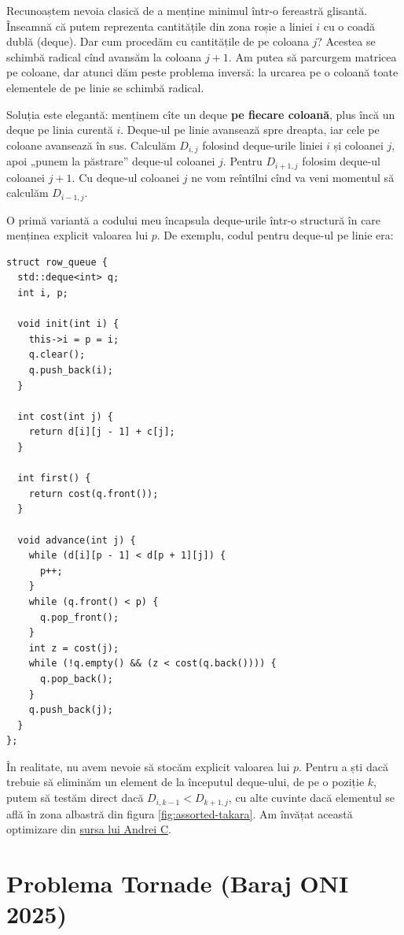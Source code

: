 Recunoaștem nevoia clasică de a menține minimul într-o fereastră glisantă. Înseamnă că putem reprezenta cantitățile din zona roșie a liniei $i$ cu o coadă dublă (deque). Dar cum procedăm cu cantitățile de pe coloana $j$? Acestea se schimbă radical cînd avansăm la coloana $j + 1$. Am putea să parcurgem matricea pe coloane, dar atunci dăm peste problema inversă: la urcarea pe o coloană toate elementele de pe linie se schimbă radical.

Soluția este elegantă: menținem cîte un deque \textbf{pe fiecare coloană}, plus încă un deque pe linia curentă $i$. Deque-ul pe linie avansează spre dreapta, iar cele pe coloane avansează în sus. Calculăm $D_{i,j}$ folosind deque-urile liniei $i$ și coloanei $j$, apoi „punem la păstrare” deque-ul coloanei $j$. Pentru $D_{i+1,j}$ folosim deque-ul coloanei $j+1$. Cu deque-ul coloanei $j$ ne vom reîntîlni cînd va veni momentul să calculăm $D_{i-1,j}$.

O primă variantă a codului meu încapsula deque-urile într-o structură în care menținea explicit valoarea lui $p$. De exemplu, codul pentru deque-ul pe linie era:

\begin{verbatim}
struct row_queue {
  std::deque<int> q;
  int i, p;

  void init(int i) {
    this->i = p = i;
    q.clear();
    q.push_back(i);
  }

  int cost(int j) {
    return d[i][j - 1] + c[j];
  }

  int first() {
    return cost(q.front());
  }

  void advance(int j) {
    while (d[i][p - 1] < d[p + 1][j]) {
      p++;
    }
    while (q.front() < p) {
      q.pop_front();
    }
    int z = cost(j);
    while (!q.empty() && (z < cost(q.back()))) {
      q.pop_back();
    }
    q.push_back(j);
  }
};
\end{verbatim}

În realitate, nu avem nevoie să stocăm explicit valoarea lui $p$. Pentru a ști dacă trebuie să eliminăm un element de la începutul deque-ului, de pe o poziție $k$, putem să testăm direct dacă $D_{i,k-1} < D_{k+1,j}$, cu alte cuvinte dacă elementul se află în zona albastră din figura \ref{fig:assorted-takara}. Am învățat această optimizare din \href{https://infoarena.ro/job_detail/3198563?action=view-source}{sursa lui Andrei C}.


\section{Problema Tornade (Baraj ONI 2025)}
\label{problem:tornade}

